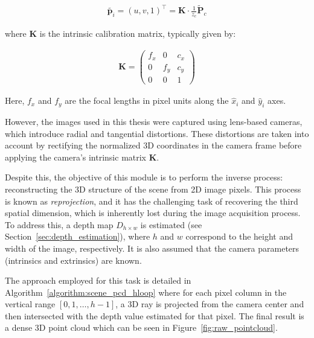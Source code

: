 \begin{align}
    \tilde{\mathbf{p}_i}
    = \left(u, v, 1\right)^\top
    = \mathbf{K} \cdot \frac{1}{z_c} \tilde{\mathbf{P}}_c
\end{align}

where $\mathbf{K}$ is the intrinsic calibration matrix, typically given by:

\begin{align}
    \mathbf{K} =
    \begin{pmatrix}
        f_x & 0 & c_x \\
        0 & f_y & c_y \\
        0 & 0 & 1
    \end{pmatrix}
\end{align}

Here, $f_x$ and $f_y$ are the focal lengths in pixel units along the $\hat{x}_i$ and $\hat{y}_i$ axes.

However, the images used in this thesis were captured using lens-based cameras, which introduce radial and tangential distortions. These distortions are taken into account by rectifying the normalized 3D coordinates in the camera frame before applying the camera's intrinsic matrix $\mathbf{K}$.

Despite this, the objective of this module is to perform the inverse process: reconstructing the 3D structure of the scene from 2D image pixels. This process is known as \textit{reprojection}, and it has the challenging task of recovering the third spatial dimension, which is inherently lost during the image acquisition process. To address this, a depth map $D_{h \times w}$ is estimated (see Section~\ref{sec:depth_estimation}), where $h$ and $w$ correspond to the height and width of the image, respectively. It is also assumed that the camera parameters (intrinsics and extrinsics) are known.

The approach employed for this task is detailed in Algorithm~\ref{algorithm:scene_pcd_hloop} where for each pixel column in the vertical range $\left[0, 1, \dots, h{-}1 \right]$, a 3D ray is projected from the camera center and then intersected with the depth value estimated for that pixel. The final result is a dense 3D point cloud which can be seen in Figure~\ref{fig:raw_pointcloud}.

